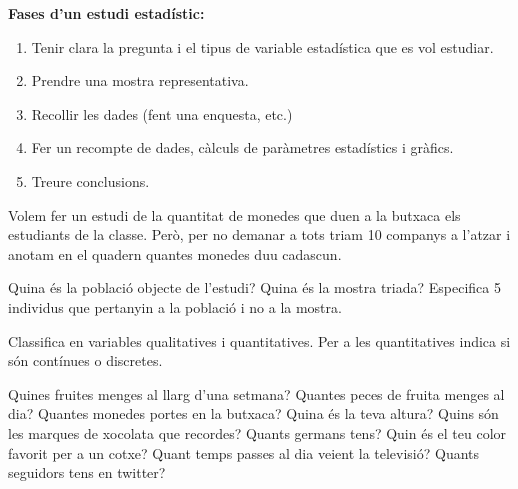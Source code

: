 \begin{theorybox}
 \textbf{Fases d'un estudi estadístic:}
\begin{enumerate} 
	\item  Tenir clara la pregunta i el tipus de variable estadística que es vol estudiar.  
	\item Prendre una mostra representativa.
	\item Recollir les dades (fent una enquesta, etc.) 
	\item  Fer un recompte de dades, càlculs de paràmetres estadístics i gràfics.
	\item Treure conclusions.
\end{enumerate} 
\end{theorybox}

\begin{mylist}

\exer Volem fer un estudi de la quantitat de monedes que duen a la butxaca els estudiants de la classe. Però, per no demanar a tots triam 10 companys a l'atzar i anotam en el quadern quantes monedes duu cadascun.

\begin{tasks}
	\task Quina és la població objecte de l'estudi?
	\task Quina és la mostra triada?
	\task Especifica 5 individus que pertanyin a la població i no a la mostra.
\end{tasks}
 
 
\exer \spen Classifica en variables qualitatives i quantitatives. Per a les quantitatives indica si són contínues o discretes.
\begin{tasks}
\task Quines fruites menges al llarg d'una setmana? \dotfill\hspace{1cm}
\task  Quantes peces de fruita menges al dia? \dotfill\hspace{1cm}
\task  Quantes monedes portes en la butxaca? \dotfill\hspace{1cm}
\task  Quina és la teva altura? \dotfill\hspace{1cm}
\task  Quins són les marques de xocolata que recordes? \dotfill\hspace{1cm}
\task  Quants germans tens? \dotfill\hspace{1cm}
\task  Quin és el teu color favorit per a un cotxe? \dotfill\hspace{1cm}
\task  Quant temps passes al dia veient la televisió? \dotfill\hspace{1cm}
\task  Quants seguidors tens en twitter? \dotfill\hspace{1cm}
\end{tasks}
 


\end{mylist}
